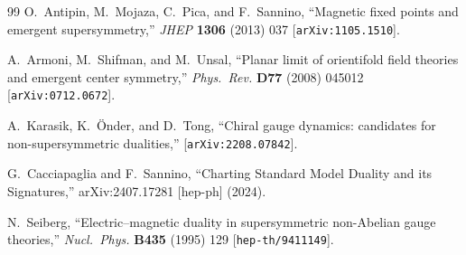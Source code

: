 \documentclass[11pt,a4paper]{article}
\begin{document}
\begin{thebibliography}{99}
  O.~Antipin, M.~Mojaza, C.~Pica, and F.~Sannino,
  ``Magnetic fixed points and emergent supersymmetry,''
  \textit{JHEP} \textbf{1306} (2013) 037
  [\texttt{arXiv:1105.1510}].

  A.~Armoni, M.~Shifman, and M.~Unsal,
  ``Planar limit of orientifold field theories and emergent
  center symmetry,''
  \textit{Phys.~Rev.} \textbf{D77} (2008) 045012
  [\texttt{arXiv:0712.0672}].

  A.~Karasik, K.~\"Onder, and D.~Tong,
  ``Chiral gauge dynamics: candidates for non-supersymmetric
  dualities,''
  [\texttt{arXiv:2208.07842}].

  G.~Cacciapaglia and F.~Sannino,
  ``Charting Standard Model Duality and its Signatures,''
  arXiv:2407.17281 [hep-ph] (2024).

  N.~Seiberg,
  ``Electric--magnetic duality in supersymmetric non-Abelian gauge
  theories,''
  \textit{Nucl.~Phys.} \textbf{B435} (1995) 129
  [\texttt{hep-th/9411149}].

\end{thebibliography}
\end{document}
